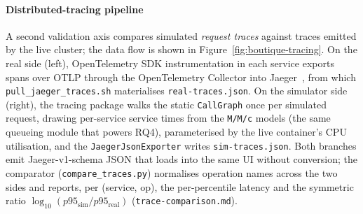 \documentclass[ASNA,twocolumn]{USG}
\begin{document}
    \paragraph{Distributed-tracing pipeline}
    A second validation axis compares simulated \emph{request traces}
    against traces emitted by the live cluster; the data flow is shown in
    Figure~\ref{fig:boutique-tracing}. On the real side (left),
    OpenTelemetry SDK instrumentation in each service exports spans over
    OTLP through the OpenTelemetry Collector into
    Jaeger~\cite{Jaeger2024,OpenTelemetry2024}, from which
    \texttt{pull\_jaeger\_traces.sh} materialises \texttt{real-traces.json}.
    On the simulator side (right), the tracing package walks the static
    \texttt{CallGraph} once per simulated request, drawing per-service
    service times from the \texttt{M/M/c} models (the same queueing module
    that powers RQ4), parameterised by the live container's CPU
    utilisation, and the \texttt{JaegerJsonExporter} writes
    \texttt{sim-traces.json}. Both branches emit Jaeger-v1-schema JSON that
    loads into the same UI without conversion; the comparator
    (\texttt{compare\_traces.py}) normalises operation names across the two
    sides and reports, per (service, op), the per-percentile latency and
    the symmetric ratio $\log_{10}(p95_\textrm{sim}/p95_\textrm{real})$
    (\texttt{trace-comparison.md}).
\end{document}
